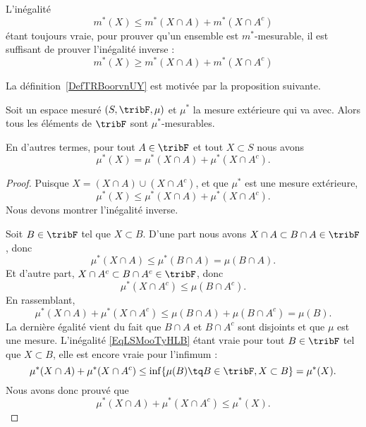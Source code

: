 \begin{remark}
	L'inégalité
	\begin{equation}
		m^*(X)\leq m^*(X\cap A)+m^*(X\cap A^c)
	\end{equation}
	étant toujours vraie, pour prouver qu'un ensemble est \( m^*\)-mesurable, il est suffisant de prouver l'inégalité inverse :
	\begin{equation}
		m^*(X)\geq m^*(X\cap A)+m^*(X\cap A^c)
	\end{equation}
\end{remark}
La définition~\ref{DefTRBoorvnUY} est motivée par la proposition suivante.

\begin{proposition} \label{PropOJFoozSKAE}
	Soit un espace mesuré \( (S,\tribF,\mu)\) et \( \mu^*\) la mesure extérieure qui va avec. Alors tous les éléments de \( \tribF\) sont \( \mu^*\)-mesurables.

	En d'autres termes, pour tout \( A\in\tribF\) et tout \( X\subset S\) nous avons
	\begin{equation}
		\mu^*(X)=\mu^*(X\cap A)+\mu^*(X\cap A^c).
	\end{equation}
\end{proposition}

\begin{proof}
	Puisque \( X=(X\cap A)\cup(X\cap A^c)\), et que \( \mu^*\) est une mesure extérieure,
	\begin{equation}
		\mu^*(X)\leq \mu^*(X\cap A)+\mu^*(X\cap A^c).
	\end{equation}
	Nous devons montrer l'inégalité inverse.

	Soit \( B\in\tribF\) tel que \( X\subset B\). D'une part nous avons \( X\cap A\subset B\cap A\in\tribF\), donc
	\begin{equation}
		\mu^*(X\cap A)\leq \mu^*(B\cap A)= \mu(B\cap A).
	\end{equation}
	Et d'autre part, \( X\cap A^c\subset B\cap A^c\in\tribF\), donc
	\begin{equation}
		\mu^*(X\cap A^c)\leq \mu(B\cap A^c).
	\end{equation}
	En rassemblant,
	\begin{equation}    \label{EqLSMooTyHLB}
		\mu^*(X\cap A)+\mu^*(X\cap A^c)\leq \mu(B\cap A)+\mu(B\cap A^c)=\mu(B).
	\end{equation}
	La dernière égalité vient du fait que \( B\cap A\) et \( B\cap A^c\) sont disjoints et que \( \mu\) est une mesure. L'inégalité \eqref{EqLSMooTyHLB} étant vraie pour tout \( B\in \tribF\) tel que \( X\subset B\), elle est encore vraie pour l'infimum :
	\begin{equation}
		\mu^*(X\cap A)+\mu^*(X\cap A^c)\leq \inf \{ \mu(B)\tq B\in\tribF,X\subset B \}=\mu^*(X).
	\end{equation}
	Nous avons donc prouvé que
	\begin{equation}
		\mu^*(X\cap A)+\mu^*(X\cap A^c)\leq \mu^*(X).
	\end{equation}
\end{proof}

